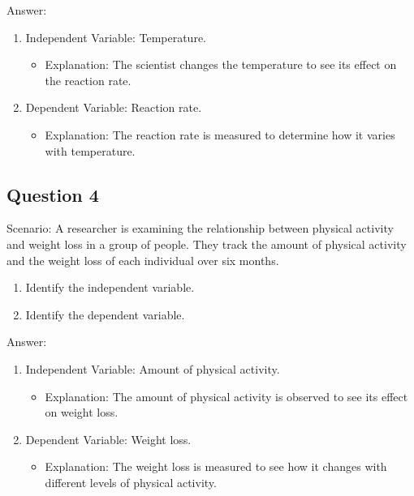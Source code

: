 \documentclass[
  letterpaper,
  DIV=11,
  numbers=noendperiod]{scrreprt}
\providecommand{\tightlist}{%
  \setlength{\itemsep}{0pt}\setlength{\parskip}{0pt}}\usepackage{longtable,booktabs,array}
\begin{document}
Answer:

\begin{enumerate}
\def\labelenumi{\arabic{enumi}.}
\tightlist
\item
  Independent Variable: Temperature.

  \begin{itemize}
  \tightlist
  \item
    Explanation: The scientist changes the temperature to see its effect
    on the reaction rate.
  \end{itemize}
\item
  Dependent Variable: Reaction rate.

  \begin{itemize}
  \tightlist
  \item
    Explanation: The reaction rate is measured to determine how it
    varies with temperature.
  \end{itemize}
\end{enumerate}

\subsection*{Question 4}\label{question-4}

Scenario: A researcher is examining the relationship between physical
activity and weight loss in a group of people. They track the amount of
physical activity and the weight loss of each individual over six
months.

\begin{enumerate}
\def\labelenumi{\arabic{enumi}.}
\tightlist
\item
  Identify the independent variable.
\item
  Identify the dependent variable.
\end{enumerate}

Answer:

\begin{enumerate}
\def\labelenumi{\arabic{enumi}.}
\tightlist
\item
  Independent Variable: Amount of physical activity.

  \begin{itemize}
  \tightlist
  \item
    Explanation: The amount of physical activity is observed to see its
    effect on weight loss.
  \end{itemize}
\item
  Dependent Variable: Weight loss.

  \begin{itemize}
  \tightlist
  \item
    Explanation: The weight loss is measured to see how it changes with
    different levels of physical activity.
  \end{itemize}
\end{enumerate}
\end{document}
